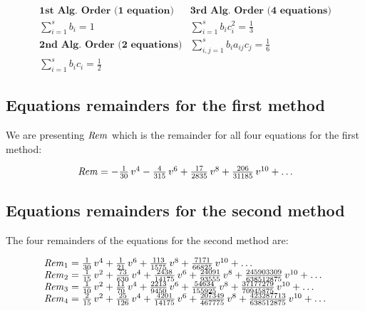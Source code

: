 \documentclass[numreferences]{kluwer}
\begin{document}
\begin{article}
\begin{equation}
\begin{array}{cc}\label{alg6_gen}
 \textbf{1st Alg. Order (1 equation)}                                           &    \textbf{3rd Alg. Order (4 equations)}\\
 {\sum\limits_{i = 1}^{s} {b_{i}} }  = 1                                        &    {\sum\limits_{i = 1}^{s} {b_{i}} } c_{i} ^{2} = \frac{1}{3}\\
 \textbf{2nd Alg. Order (2 equations)}                                          &   {\sum\limits_{i,j = 1}^{s} {b_{i}} } a_{ij} c_{j} = \frac{1}{6}\\
 {\sum\limits_{i = 1}^{s} {b_{i}} } c_{i} = \frac{1}{2}
\end{array}
\end{equation}

\subsection{Equations remainders for the first method}

We are presenting ${\it Rem}$ which is the remainder for all four equations for the first method:

\begin{equation}
\begin{array}{l}
{\it Rem} = -\frac{1}{30}\,{v}^{4}-{\frac {4}{315}}\,{v}^{6}+{\frac {17}{2835}}\,{v}^{8}+{\frac {206}{31185}}\,{v}^{10}+\ldots
\end{array}
\end{equation}

\subsection{Equations remainders for the second method}

The four remainders of the equations for the second method are:

{}
\begin{equation}
\begin{array}{l}
{\it Rem}_{{1}} = \frac{1}{30}\,{v}^{4}+\frac{1}{21}\,{v}^{6}+{\frac {113}{1575}}\,{v}^{8}+{\frac {7171}{66825}}\,{v}^{10}+\ldots\\
{\it Rem}_{{2}} = \frac{1}{15}\,{v}^{2}+{\frac {73}{630}}\,{v}^{4}+{\frac {2438}{14175}}\,{v}^{6}+{\frac {24091}{93555}}\,{v}^{8}+{\frac {245903309}{638512875}}\,{v}^{10}+\ldots\\
{\it Rem}_{{3}} = \frac{1}{10}\,{v}^{2}+{\frac {11}{70}}\,{v}^{4}+{\frac {2213}{9450}}\,{v}^{6}+{\frac {54634}{155925}}\,{v}^{8}+{\frac {37177279}{70945875}}\,{v}^{10}+\ldots\\
{\it Rem}_{{4}} = \frac{2}{15}\,{v}^{2}+{\frac {25}{126}}\,{v}^{4}+{\frac {4201}{14175}}\,{v}^{6}+{\frac {207349}{467775}}\,{v}^{8}+{\frac {423287713}{638512875}}\,{v}^{10}+\ldots\\
\end{array}
\end{equation}
{}


\end{article}
\end{document}
